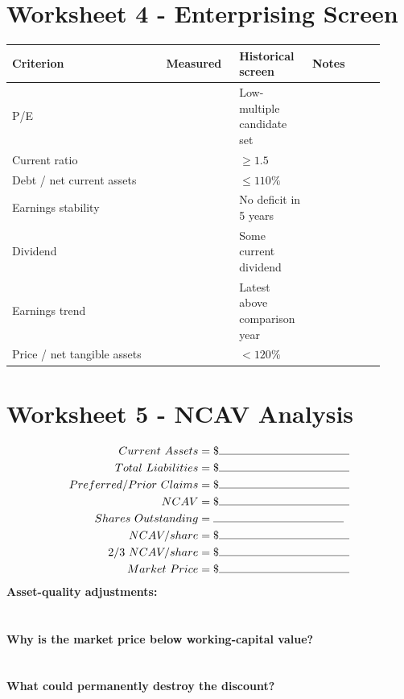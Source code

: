 \documentclass[11pt]{article}
\newcommand{\blankline}{\makebox[\linewidth][l]{\rule{0.96\linewidth}{0.35pt}}}
\begin{document}
\section{Worksheet 4 - Enterprising Screen}
\begin{longtable}{@{}p{0.38\linewidth}p{0.18\linewidth}p{0.18\linewidth}p{0.18\linewidth}@{}}
\toprule
\textbf{Criterion} & \textbf{Measured} & \textbf{Historical screen} & \textbf{Notes}\\
\midrule
P/E & & Low-multiple candidate set & \\
Current ratio & & $\ge1.5$ & \\
Debt / net current assets & & $\le110\%$ & \\
Earnings stability & & No deficit in 5 years & \\
Dividend & & Some current dividend & \\
Earnings trend & & Latest above comparison year & \\
Price / net tangible assets & & $<120\%$ & \\
\bottomrule
\end{longtable}

\section{Worksheet 5 - NCAV Analysis}
\begin{worksheetbox}
\begin{align*}
Current\ Assets &= \$\rule{1.6in}{0.35pt}\\
Total\ Liabilities &= \$\rule{1.6in}{0.35pt}\\
Preferred/Prior\ Claims &= \$\rule{1.6in}{0.35pt}\\
NCAV &= \$\rule{1.6in}{0.35pt}\\
Shares\ Outstanding &= \rule{1.6in}{0.35pt}\\
NCAV/share &= \$\rule{1.6in}{0.35pt}\\
2/3\ NCAV/share &= \$\rule{1.6in}{0.35pt}\\
Market\ Price &= \$\rule{1.6in}{0.35pt}
\end{align*}
\textbf{Asset-quality adjustments:}\\[4pt]\blankline\\[10pt]\blankline\\[10pt]
\textbf{Why is the market price below working-capital value?}\\[4pt]\blankline\\[10pt]\blankline\\[10pt]
\textbf{What could permanently destroy the discount?}\\[4pt]\blankline\\[10pt]\blankline
\end{worksheetbox}
\end{document}
